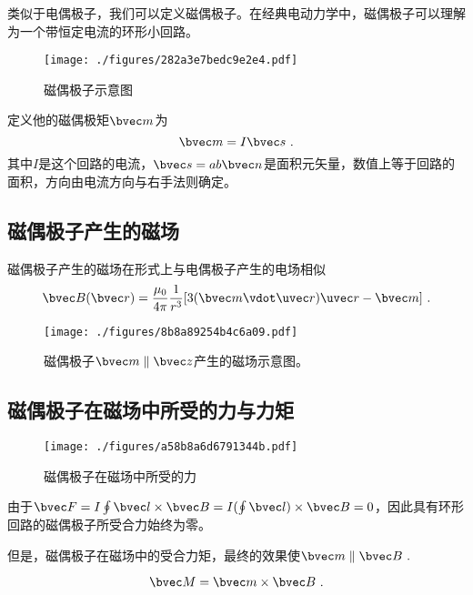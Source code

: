 
\begin{issues}
\issueDraft
\end{issues}
类似于电偶极子，我们可以定义磁偶极子。在经典电动力学中，磁偶极子可以理解为一个带恒定电流的环形小回路。
\begin{figure}[ht]
\centering
\texttt{[image: ./figures/282a3e7bedc9e2e4.pdf]}
\caption{磁偶极子示意图} \label{fig_Bdipol_1}
\end{figure}

定义他的磁偶极矩$\bvec m$为
\begin{equation}
\bvec m = I \bvec s~.
\end{equation}
其中$I$是这个回路的电流，$\bvec s = ab\bvec n$是面积元矢量，数值上等于回路的面积，方向由电流方向与右手法则确定。

\subsection{磁偶极子产生的磁场}
磁偶极子产生的磁场在形式上与电偶极子产生的电场相似
\begin{equation}
\bvec B(\bvec r) = \frac{\mu_0}{4\pi} \frac{1}{r^3} [3(\bvec m \vdot \uvec r) \uvec r - \bvec m]~.
\end{equation}
\begin{figure}[ht]
\centering
\texttt{[image: ./figures/8b8a89254b4c6a09.pdf]}
\caption{磁偶极子$\bvec m \parallel \bvec z $产生的磁场示意图。} \label{fig_Bdipol_3}
\end{figure}

\subsection{磁偶极子在磁场中所受的力与力矩}
\begin{figure}[ht]
\centering
\texttt{[image: ./figures/a58b8a6d6791344b.pdf]}
\caption{磁偶极子在磁场中所受的力} \label{fig_Bdipol_2}
\end{figure}
由于$\bvec F = I \oint \bvec l \times \bvec B = I (\oint \bvec l) \times \bvec B = 0$，因此具有环形回路的磁偶极子所受合力始终为零。

但是，磁偶极子在磁场中的受合力矩，最终的效果使$\bvec m \parallel \bvec B~.$

\begin{equation}
\bvec M = \bvec m \times \bvec B~.
\end{equation}
